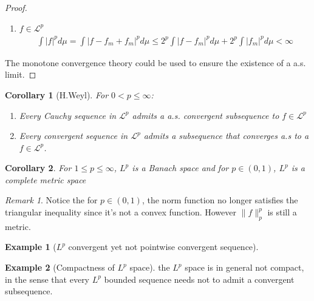 \documentclass[a4paper,11pt,oneside,fleqn]{book}
\newtheorem{corollary}{Corollary}[theorem]
\theoremstyle{definition}
\newtheorem*{example}{Example}
\theoremstyle{remark}
\newtheorem*{remark}{Remark}
\begin{document}
\begin{proof}
\begin{itemize}
\begin{enumerate}
\begin{align*}
			\end{align*}
			Since the sequence and the subsequence are $L^p$ convergent, we have that: $\liminf_k \int |f_{n_k} - f_m|^p d\mu \rightarrow 0$
			\item $f \in \mathcal{L}^p$
			\begin{align*}
				\int |f|^p d\mu = \int |f -f_m + f_m|^p d\mu 
				\leq 2^p \int |f-f_m|^p d\mu + 2^p \int |f_m|^p d\mu < \infty
			\end{align*}
		\end{enumerate}
	\end{itemize}
	The monotone convergence theory could be used to ensure the existence of a a.s. limit.
\end{proof}
	
\begin{corollary}[H.Weyl]
	For $0 < p \leq \infty$:
	\begin{enumerate}
		\item Every Cauchy sequence in $\mathcal{L}^p$ admits a a.s. convergent subsequence to $ f \in \mathcal{L}^p$
		\item Every convergent sequence in $\mathcal{L}^p$ admits a subsequence that converges a.s to a $f \in \mathcal{L}^p$.
	\end{enumerate}
\end{corollary}
	
\begin{corollary}
	For $1 \leq p \leq \infty$, $L^p$ is a Banach space and for $p \in (0, 1)$, $L^p$ is a complete metric space
\end{corollary}
\begin{remark}
Notice the for $p \in (0, 1)$, the norm function no longer satisfies the triangular inequality since it's not a convex function.	However $\|f\|_p^p$ is still a metric.
\end{remark}

\begin{example}[$L^p$ convergent yet not pointwise convergent sequence]
\end{example}

\begin{example}[Compactness of $L^p$ space]
	the $L^p$ space is in general not compact, in the sense that every $L^p$ bounded sequence needs not to admit a convergent subsequence.
\end{example}
\end{document}
